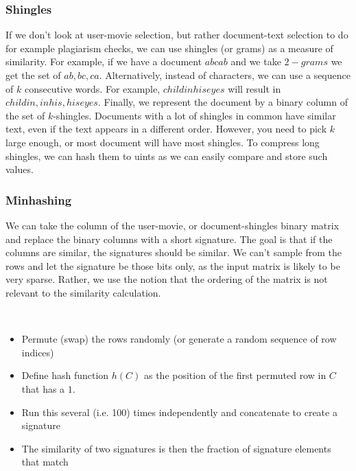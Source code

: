 \subsubsection{Shingles}

If we don't look at user-movie selection, but rather document-text selection to
do for example plagiarism checks, we can use shingles (or grams) as a measure of
similarity. For example, if we have a document $abcab$ and we take $2-grams$ we
get the set of ${ab, bc, ca}$. Alternatively, instead of characters, we can use
a sequence of $k$ consecutive words. For example, $child in his eyes$
will result
in ${child in, in his, his eyes}$.
Finally, we represent the document by a binary column of the set of
$k$-shingles.
Documents with a lot of shingles in common have similar text, even if the text
appears in a different order. However, you need to pick $k$ large
enough, or most
document will have most shingles.
To compress long shingles, we can hash them to uints as we can easily
compare and
store such values.

\subsubsection{Minhashing}

We can take the column of the user-movie, or document-shingles binary matrix
and replace the binary columns with a short signature. The goal is that if the
columns are similar, the signatures should be similar. We can't sample from the
rows and let the signature be those bits only, as the input matrix is likely to
be very sparse. Rather, we use the notion that the ordering of the matrix is not
relevant to the similarity calculation.

\begin{definition}[Minhashing]
  ~
  \begin{itemize}
    \item Permute (swap) the rows randomly (or generate a random
      sequence of row indices)
    \item Define hash function $h(C)$ as the position of the first
      permuted row in $C$ that has a $1$.
    \item Run this several (i.e. 100) times independently and
      concatenate to create a signature
    \item The similarity of two signatures is then the fraction of
      signature elements that match
  \end{itemize}
\end{definition}

